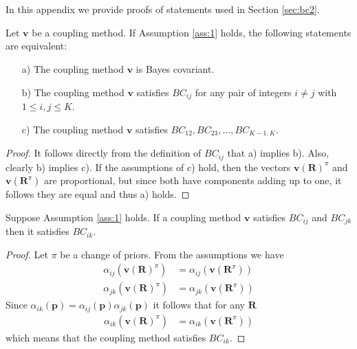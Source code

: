 \appendix

\section{}
\label{app:bc1}

In this appendix we provide proofs of statements used in Section \ref{sec:bc2}.

\begin{prop} \label{prop:bcprop}
	Let $\boldsymbol{v}$ be a coupling method. If Assumption \ref{ass:1} holds, the following statements are equivalent:
	\begin{itemize}
		\item[a)] The coupling method $\boldsymbol{v}$ is Bayes covariant.
		\item[b)] The coupling method $\boldsymbol{v}$ satisfies $BC_{ij}$ for any pair of integers  $i\not= j$ with $1\leq i,j \leq K$.
		\item[c)] The coupling method $\boldsymbol{v}$ satisfies $BC_{12}, BC_{23}, \ldots, BC_{K-1,K}$.
	\end{itemize}
\end{prop}
\begin{proof}
It follows directly from the definition of $BC_{ij}$ that a) implies b). Also, clearly b) implies c). If the assumptions of c) hold, then the vectors $\boldsymbol{v}(\boldsymbol{R})^\pi$ and $ \boldsymbol{v}(\boldsymbol{R}^\pi)$ are proportional, but since both have components adding up to one, it follows they are equal and thus a) holds.
\end{proof}

\begin{lem} \label{lem:transitivity}
	Suppose Assumption \ref{ass:1} holds. If a coupling method $\boldsymbol{v}$ satisfies $BC_{ij}$ and $BC_{jk}$ then it satisfies $BC_{ik}$.
\end{lem}
\begin{proof}
	Let $\pi$ be a change of priors. From the assumptions we have 
	\begin{align}
		\alpha_{ij}(\boldsymbol{v}(\boldsymbol{R})^\pi ) &= \alpha_{ij}(\boldsymbol{v}(\boldsymbol{R}^\pi) ) \\
		\alpha_{jk}(\boldsymbol{v}(\boldsymbol{R})^\pi ) &= \alpha_{jk}(\boldsymbol{v}(\boldsymbol{R}^\pi) )
	\end{align}
	Since $\alpha_{ik}(\boldsymbol{p}) = \alpha_{ij}(\boldsymbol{p})  \alpha_{jk}(\boldsymbol{p})$ it follows that for any $\boldsymbol{R}$
	\begin{align}
		\alpha_{ik}(\boldsymbol{v}(\boldsymbol{R})^\pi ) &= \alpha_{ik}(\boldsymbol{v}(\boldsymbol{R}^\pi) )
	\end{align}
	which means that the coupling method satisfies $BC_{ik}$.
\end{proof}

